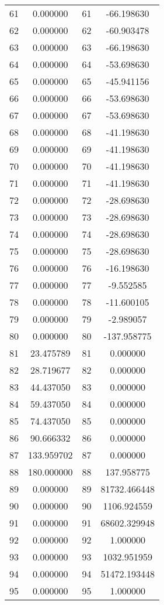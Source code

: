 \documentclass[12pt]{article}
\begin{document}
\begin{longtable}{@{}cccc@{}}
61 & 0.000000 & 61 & -66.198630 \\
62 & 0.000000 & 62 & -60.903478 \\
63 & 0.000000 & 63 & -66.198630 \\
64 & 0.000000 & 64 & -53.698630 \\
65 & 0.000000 & 65 & -45.941156 \\
66 & 0.000000 & 66 & -53.698630 \\
67 & 0.000000 & 67 & -53.698630 \\
68 & 0.000000 & 68 & -41.198630 \\
69 & 0.000000 & 69 & -41.198630 \\
70 & 0.000000 & 70 & -41.198630 \\
71 & 0.000000 & 71 & -41.198630 \\
72 & 0.000000 & 72 & -28.698630 \\
73 & 0.000000 & 73 & -28.698630 \\
74 & 0.000000 & 74 & -28.698630 \\
75 & 0.000000 & 75 & -28.698630 \\
76 & 0.000000 & 76 & -16.198630 \\
77 & 0.000000 & 77 & -9.552585 \\
78 & 0.000000 & 78 & -11.600105 \\
79 & 0.000000 & 79 & -2.989057 \\
80 & 0.000000 & 80 & -137.958775 \\
81 & 23.475789 & 81 & 0.000000 \\
82 & 28.719677 & 82 & 0.000000 \\
83 & 44.437050 & 83 & 0.000000 \\
84 & 59.437050 & 84 & 0.000000 \\
85 & 74.437050 & 85 & 0.000000 \\
86 & 90.666332 & 86 & 0.000000 \\
87 & 133.959702 & 87 & 0.000000 \\
88 & 180.000000 & 88 & 137.958775 \\
89 & 0.000000 & 89 & 81732.466448 \\
90 & 0.000000 & 90 & 1106.924559 \\
91 & 0.000000 & 91 & 68602.329948 \\
92 & 0.000000 & 92 & 1.000000 \\
93 & 0.000000 & 93 & 1032.951959 \\
94 & 0.000000 & 94 & 51472.193448 \\
95 & 0.000000 & 95 & 1.000000 \\

\end{longtable}
\end{document}
